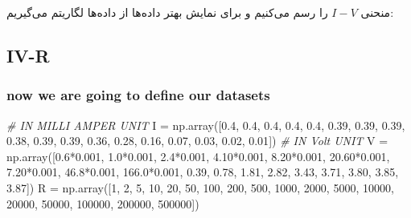 \documentclass{article}
\newenvironment{Shaded}{}{}
\newcommand{\CommentTok}[1]{\textcolor[rgb]{0.38,0.63,0.69}{\textit{#1}}}
\newcommand{\DecValTok}[1]{\textcolor[rgb]{0.25,0.63,0.44}{#1}}
\newcommand{\FloatTok}[1]{\textcolor[rgb]{0.25,0.63,0.44}{#1}}
\newcommand{\NormalTok}[1]{#1}
\newcommand{\OperatorTok}[1]{\textcolor[rgb]{0.40,0.40,0.40}{#1}}
\begin{document}
منحنی $I-V$ را رسم ‌می‌کنیم و برای نمایش بهتر داده‌ها از داده‌ها لگاریتم می‌‌گیریم: 
\begin{latin}
\hypertarget{iv-r}{%
\section{IV-R}\label{iv-r}}
\hypertarget{now-we-are-going-to-define-our-datasets}{%
\subsubsection{now we are going to define our
datasets}\label{now-we-are-going-to-define-our-datasets}}
\begin{Shaded}
\begin{Highlighting}[]
\CommentTok{\# IN MILLI AMPER UNIT}
\NormalTok{I }\OperatorTok{=}\NormalTok{ np.array([}\FloatTok{0.4}\NormalTok{, }\FloatTok{0.4}\NormalTok{, }\FloatTok{0.4}\NormalTok{, }\FloatTok{0.4}\NormalTok{, }\FloatTok{0.4}\NormalTok{, }\FloatTok{0.39}\NormalTok{, }\FloatTok{0.39}\NormalTok{, }\FloatTok{0.39}\NormalTok{, }\FloatTok{0.38}\NormalTok{, }\FloatTok{0.39}\NormalTok{, }\FloatTok{0.39}\NormalTok{, }\FloatTok{0.36}\NormalTok{, }\FloatTok{0.28}\NormalTok{, }\FloatTok{0.16}\NormalTok{, }\FloatTok{0.07}\NormalTok{, }\FloatTok{0.03}\NormalTok{, }\FloatTok{0.02}\NormalTok{, }\FloatTok{0.01}\NormalTok{])}
\CommentTok{\# IN Volt UNIT}
\NormalTok{V }\OperatorTok{=}\NormalTok{ np.array([}\FloatTok{0.6}\OperatorTok{*}\FloatTok{0.001}\NormalTok{, }\FloatTok{1.0}\OperatorTok{*}\FloatTok{0.001}\NormalTok{, }\FloatTok{2.4}\OperatorTok{*}\FloatTok{0.001}\NormalTok{, }\FloatTok{4.10}\OperatorTok{*}\FloatTok{0.001}\NormalTok{, }\FloatTok{8.20}\OperatorTok{*}\FloatTok{0.001}\NormalTok{, }\FloatTok{20.60}\OperatorTok{*}\FloatTok{0.001}\NormalTok{, }\FloatTok{7.20}\OperatorTok{*}\FloatTok{0.001}\NormalTok{,}
\FloatTok{46.8}\OperatorTok{*}\FloatTok{0.001}\NormalTok{, }\FloatTok{166.0}\OperatorTok{*}\FloatTok{0.001}\NormalTok{, }\FloatTok{0.39}\NormalTok{, }\FloatTok{0.78}\NormalTok{, }\FloatTok{1.81}\NormalTok{, }\FloatTok{2.82}\NormalTok{, }\FloatTok{3.43}\NormalTok{, }\FloatTok{3.71}\NormalTok{, }\FloatTok{3.80}\NormalTok{, }\FloatTok{3.85}\NormalTok{, }\FloatTok{3.87}\NormalTok{])}
\NormalTok{R }\OperatorTok{=}\NormalTok{ np.array([}\DecValTok{1}\NormalTok{, }\DecValTok{2}\NormalTok{, }\DecValTok{5}\NormalTok{, }\DecValTok{10}\NormalTok{, }\DecValTok{20}\NormalTok{, }\DecValTok{50}\NormalTok{, }\DecValTok{100}\NormalTok{, }\DecValTok{200}\NormalTok{, }\DecValTok{500}\NormalTok{, }\DecValTok{1000}\NormalTok{, }\DecValTok{2000}\NormalTok{, }\DecValTok{5000}\NormalTok{, }\DecValTok{10000}\NormalTok{, }\DecValTok{20000}\NormalTok{, }\DecValTok{50000}\NormalTok{, }\DecValTok{100000}\NormalTok{, }\DecValTok{200000}\NormalTok{, }\DecValTok{500000}\NormalTok{])}

\end{Highlighting}
\end{Shaded}
\end{latin}
\end{document}
